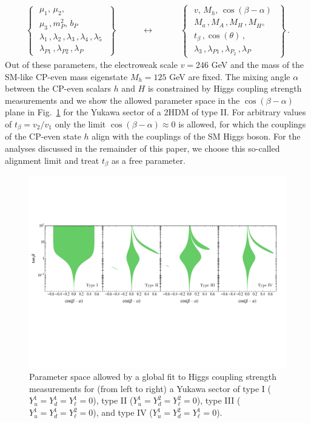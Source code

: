 \begin{align}
\left\{ \,\,\begin{matrix}
\mu_1,\,\mu_2,\\[3pt]
\mu_3\,, m_P^2,\, b_P\\[3pt]
\lambda_1\,,\lambda_2\,,\lambda_3\,,\lambda_4\,,\lambda_5\\
\lambda_{P1}\,,\lambda_{P2} \,, \lambda_P
\end{matrix}\,\,\right\}\qquad \quad \longleftrightarrow \quad \qquad \left\{ \,\,\begin{matrix}
v,\, M_h,\,\cos(\beta-\alpha)\\[3pt]
M_a\,, M_A\,, M_H\,,M_{H^\pm}\\[3pt]
t_\beta\,, \cos(\theta)\,, \\[3pt]
\lambda_3\,,\lambda_{P1}\,,\lambda_{P_2}\,,\lambda_P
\end{matrix}\,\,\right\}\,.
\end{align}
Out of these parameters, the electroweak scale $v=246$ GeV and the mass of the SM-like CP-even mass eigenstate $M_h=125$ GeV are fixed. The mixing angle $\alpha$ between the CP-even scalars $h$ and $H$ is constrained by Higgs coupling strength measurements \cite{} and we show the allowed parameter space in the $\cos(\beta-\alpha)$ plane in  Fig.~\ref{fig:higgsfit} for the Yukawa sector of a 2HDM of type II.  For arbitrary values of $t_\beta=v_2/v_1$ only the limit $\cos(\beta-\alpha)\approx 0$ is allowed, for which the couplings of the CP-even state $h$ align with the couplings of the SM Higgs boson. For the analyses discussed in the remainder of this paper, we choose this so-called alignment limit and treat $t_\beta$ as a free parameter.
\begin{figure}[t]
\includegraphics[width=\textwidth]{Figs/Higgsfit}
\caption{\label{fig:higgsfit} Parameter space allowed by a global fit to Higgs coupling strength measurements for (from left to right) a Yukawa sector of type I ($Y_u^1  = Y_d^1 = Y_\ell^1 =0$), type II ($Y_u^1 = Y_d^2 = Y_\ell^2 =0$),  type III ($Y_u^1 = Y_d^1 = Y_\ell^2 =0$), and type IV ($Y_u^1  = Y_d^2 = Y_\ell^1 =0$). }
\end{figure}
